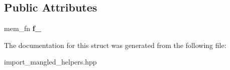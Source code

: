 \subsection*{Public Attributes}
\begin{DoxyCompactItemize}
\item 
\mbox{\label{a01536_afb9e2f791ab45abe26b4053a9da00b6c}} 
mem\+\_\+fn {\bfseries f\+\_\+}
\end{DoxyCompactItemize}


The documentation for this struct was generated from the following file\+:\begin{DoxyCompactItemize}
\item 
import\+\_\+mangled\+\_\+helpers.\+hpp\end{DoxyCompactItemize}
